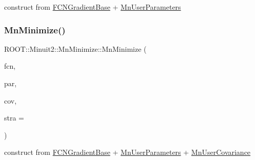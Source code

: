 construct from \mbox{\hyperlink{classROOT_1_1Minuit2_1_1FCNGradientBase}{F\+C\+N\+Gradient\+Base}} + \mbox{\hyperlink{classROOT_1_1Minuit2_1_1MnUserParameters}{Mn\+User\+Parameters}} 

\mbox{\label{classROOT_1_1Minuit2_1_1MnMinimize_a669845a1aaba36456664f1e98a615e25}} 
\subsubsection{\texorpdfstring{MnMinimize()}{MnMinimize()}\hspace{0.1cm}{\footnotesize\ttfamily [11/26]}}
{\footnotesize\ttfamily R\+O\+O\+T\+::\+Minuit2\+::\+Mn\+Minimize\+::\+Mn\+Minimize (\begin{DoxyParamCaption}\item[{const \mbox{\hyperlink{classROOT_1_1Minuit2_1_1FCNGradientBase}{F\+C\+N\+Gradient\+Base}} \&}]{fcn,  }\item[{const \mbox{\hyperlink{classROOT_1_1Minuit2_1_1MnUserParameters}{Mn\+User\+Parameters}} \&}]{par,  }\item[{const \mbox{\hyperlink{classROOT_1_1Minuit2_1_1MnUserCovariance}{Mn\+User\+Covariance}} \&}]{cov,  }\item[{unsigned int}]{stra = {} }\end{DoxyParamCaption})\hspace{0.3cm}{\ttfamily [inline]}}



construct from \mbox{\hyperlink{classROOT_1_1Minuit2_1_1FCNGradientBase}{F\+C\+N\+Gradient\+Base}} + \mbox{\hyperlink{classROOT_1_1Minuit2_1_1MnUserParameters}{Mn\+User\+Parameters}} + \mbox{\hyperlink{classROOT_1_1Minuit2_1_1MnUserCovariance}{Mn\+User\+Covariance}} 

\mbox{\label{classROOT_1_1Minuit2_1_1MnMinimize_ae607cd588cff70b64c0705bb86a36ba0}} 
